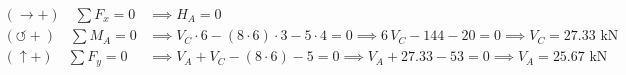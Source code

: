 \begin{align}

    (\rightarrow +) \quad \sum F_x = 0      & \implies \boxed{H_A = 0}                                                                                                         \\

    (\circlearrowleft +) \quad \sum M_A = 0 & \implies V_C \cdot 6 - (8 \cdot 6) \cdot 3 - 5 \cdot 4 = 0 \implies 6\,V_C - 144 - 20 = 0 \implies \boxed{V_C = 27.33\text{ kN}} \\

    (\uparrow +) \quad \sum F_y = 0         & \implies V_A + V_C - (8 \cdot 6) - 5 = 0 \implies V_A + 27.33 - 53 = 0 \implies \boxed{V_A = 25.67\text{ kN}}

\end{align}






